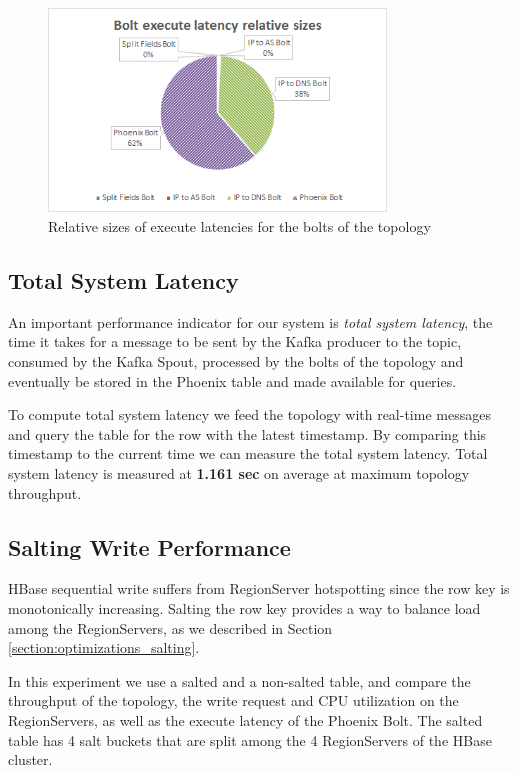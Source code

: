 \begin{figure}[H]
\centering
\includegraphics[width=0.8\textwidth]{figures/benchmarks_storm_execute_latencies}
\caption{Relative sizes of execute latencies for the bolts of the topology}
\label{figure:benchmarks_storm_execute_latencies}
\end{figure}

\subsection{Total System Latency}

An important performance indicator for our system is \emph{total system latency}, the time it takes for a message to be sent by the Kafka producer to the topic, consumed by the Kafka Spout, processed by the bolts of the topology and eventually be stored in the Phoenix table and made available for queries.

To compute total system latency we feed the topology with real-time messages and query the table for the row with the latest timestamp. By comparing this timestamp to the current time we can measure the total system latency. Total system latency is measured at \textbf{1.161 sec} on average at maximum topology throughput.

\subsection{Salting Write Performance}\label{subsection:benchmarks_storm_salting}

HBase sequential write suffers from RegionServer hotspotting since the row key is monotonically increasing. Salting the row key provides a way to balance load among the RegionServers, as we described in Section \ref{section:optimizations_salting}.

In this experiment we use a salted and a non-salted table, and compare the throughput of the topology, the write request and CPU utilization on the RegionServers, as well as the execute latency of the Phoenix Bolt. The salted table has 4 salt buckets that are split among the 4 RegionServers of the HBase cluster.

